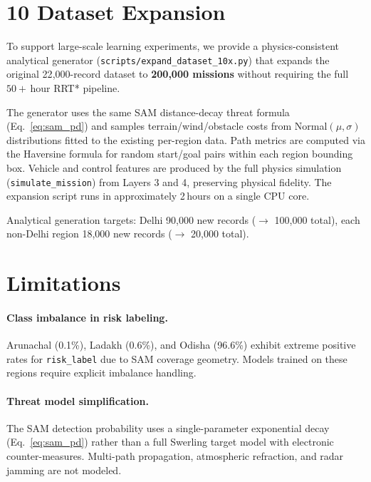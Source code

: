 \documentclass{article}
\begin{document}
\section{10\texttimes{} Dataset Expansion}
\label{sec:expansion}

To support large-scale learning experiments, we provide a physics-consistent
analytical generator (\texttt{scripts/expand\_dataset\_10x.py}) that expands
the original 22{,}000-record dataset to \textbf{200{,}000 missions} without
requiring the full $50+$\,hour RRT* pipeline.

The generator uses the same SAM distance-decay threat formula (Eq.~\ref{eq:sam_pd})
and samples terrain/wind/obstacle costs from Normal$(\mu, \sigma)$ distributions
fitted to the existing per-region data. Path metrics are computed via the
Haversine formula for random start/goal pairs within each region bounding box.
Vehicle and control features are produced by the full physics simulation
(\texttt{simulate\_mission}) from Layers 3 and 4, preserving physical fidelity.
The expansion script runs in approximately 2\,hours on a single CPU core.

Analytical generation targets:
Delhi 90{,}000 new records ($\to$ 100{,}000 total),
each non-Delhi region 18{,}000 new records ($\to$ 20{,}000 total).

\section{Limitations}
\label{sec:limitations}

\paragraph{Class imbalance in risk labeling.}
Arunachal (0.1\%), Ladakh (0.6\%), and Odisha (96.6\%) exhibit extreme
positive rates for \texttt{risk\_label} due to SAM coverage geometry.
Models trained on these regions require explicit imbalance handling.

\paragraph{Threat model simplification.}
The SAM detection probability uses a single-parameter exponential decay
(Eq.~\ref{eq:sam_pd}) rather than a full Swerling target model with
electronic counter-measures. Multi-path propagation, atmospheric refraction,
and radar jamming are not modeled.
\end{document}
